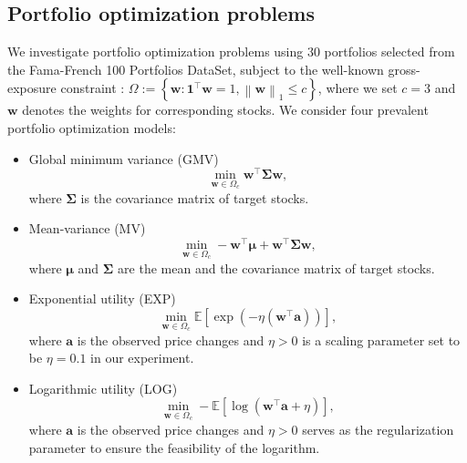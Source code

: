 \documentclass[aos]{imsart}
\numberwithin{equation}{section}
\theoremstyle{plain}
\begin{document}
\subsection{Portfolio optimization problems}
We investigate portfolio optimization problems using $30$ portfolios selected from the Fama-French 100 Portfolios DataSet, subject to the well-known gross-exposure constraint \cite{fan2012vast}:
$\Omega := \left\{\bm{w}: \bm{1}^{\top} \bm{w} = 1, \left\| \bm{w} \right\|_1 \leq c\right\}$,
where we set $c =3$ and $\bm{w}$ denotes the weights for corresponding stocks. We consider four prevalent portfolio optimization models:
\begin{itemize}
        \item Global minimum variance (GMV)
        \begin{equation*}
            \min_{\bm{w} \in \Omega_c} \bm{w}^{\top} \bm{\Sigma} \bm{w},
        \end{equation*}
        where $\bm{\Sigma}$ is the covariance matrix of target stocks.

        \item Mean-variance (MV)
        \begin{equation*}
            \min_{\bm{w} \in \Omega_c}  -\bm{w}^{\top}\bm{\mu} + \bm{w}^{\top} \bm{\Sigma} \bm{w},
        \end{equation*}
        where $\bm{\mu}$ and $\bm{\Sigma}$ are the mean and the covariance matrix of target stocks.

        \item Exponential utility (EXP)
        \begin{equation*}
            \min_{\bm{w} \in \Omega_c} \mathbb{E} \left[ \exp \left(-\eta \left(\bm{w}^{\top} \bm{a} \right)\right) \right],
        \end{equation*}
        where $\bm{a}$ is the observed price changes and $\eta>0$ is a scaling parameter set to be $\eta= 0.1$ in our experiment.

        \item Logarithmic utility (LOG) $$\min_{\bm{w} \in \Omega_c}  -\mathbb{E} \left[ \log \left( \bm{w}^{\top} \bm{a} + \eta \right)  \right],$$
        where $\bm{a}$ is the observed price changes and $\eta>0$ serves as the regularization parameter to ensure the feasibility of the logarithm.
    \end{itemize}
\end{document}
